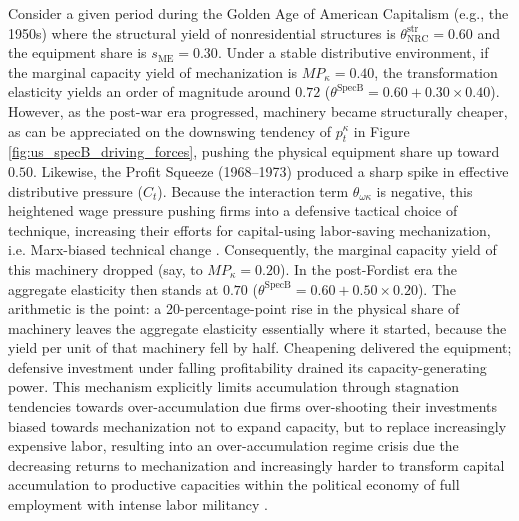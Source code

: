 Consider a given period during the Golden Age of American Capitalism (e.g., the 1950s) where the structural yield of nonresidential structures is $\theta_{\text{NRC}}^{\text{str}} = 0.60$ and the equipment share is $s_{\text{ME}} = 0.30$. Under a stable distributive environment, if the marginal capacity yield of mechanization is $MP_{\kappa} = 0.40$, the transformation elasticity yields an order of magnitude around $0.72$ ($\theta^{\text{SpecB}} = 0.60 + 0.30 \times 0.40$). However, as the post-war era progressed, machinery became structurally cheaper, as can be appreciated on the downswing tendency of $p_t^{\kappa}$ in Figure \ref{fig:us_specB_driving_forces}, pushing the physical equipment share up toward $0.50$. Likewise, the Profit Squeeze (1968--1973) produced a sharp spike in effective distributive pressure ($C_t$). Because the interaction term $\theta_{\omega\kappa}$ is negative, this heightened wage pressure pushing firms into a defensive tactical choice of technique, increasing their efforts for capital-using labor-saving mechanization, i.e. Marx-biased technical change \citep{Basu2022}. Consequently, the marginal capacity yield of this machinery dropped (say, to $MP_{\kappa} = 0.20$). In the post-Fordist era the aggregate elasticity then stands at $0.70$ ($\theta^{\text{SpecB}} = 0.60 + 0.50 \times 0.20$). The arithmetic is the point: a 20-percentage-point rise in the physical share of machinery leaves the aggregate elasticity essentially where it started, because the yield per unit of that machinery fell by half. Cheapening delivered the equipment; defensive investment under falling profitability drained its capacity-generating power. This mechanism explicitly limits accumulation through stagnation tendencies towards over-accumulation due firms over-shooting their investments biased towards mechanization not to expand capacity, but to replace increasingly expensive labor, resulting into an over-accumulation regime crisis due the decreasing returns to mechanization and increasingly harder to transform capital accumulation to productive capacities within the political economy of full employment with intense labor militancy \citep{Kalecki1943}. 


